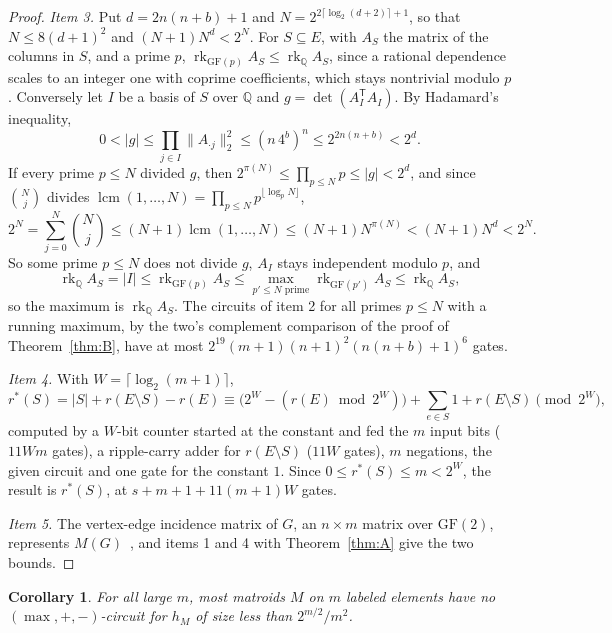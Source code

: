 \documentclass[11pt]{article}
\newtheorem{corollary}[theorem]{Corollary}
\begin{document}
\begin{proof}
\emph{Item 3.}  Put $d=2n(n+b)+1$ and $N=2^{2\lceil\log_2(d+2)\rceil+1}$, so that
$N\le8(d+1)^{2}$ and $(N+1)N^{d}<2^{N}$.  For $S\subseteq E$, with $A_S$ the
matrix of the columns in $S$, and a prime $p$,
$\operatorname{rk}_{\mathrm{GF}(p)}A_S\le\operatorname{rk}_{\mathbb Q}A_S$, since a
rational dependence scales to an integer one with coprime coefficients, which
stays nontrivial modulo $p$.  Conversely let $I$ be a basis of $S$ over
$\mathbb Q$ and $g=\det(A_I^{\mathsf T}A_I)$.  By Hadamard's inequality,
\[
  0<|g|\le\prod_{j\in I}\|A_{\cdot j}\|_2^{2}\le(n\,4^{b})^{n}\le2^{2n(n+b)}<2^{d}.
\]
If every prime $p\le N$ divided $g$, then $2^{\pi(N)}\le\prod_{p\le N}p\le|g|<2^{d}$,
and since $\binom Nj$ divides
$\operatorname{lcm}(1,\ldots,N)=\prod_{p\le N}p^{\lfloor\log_pN\rfloor}$,
\[
  2^{N}=\sum_{j=0}^{N}\binom Nj\le(N+1)\operatorname{lcm}(1,\ldots,N)
  \le(N+1)N^{\pi(N)}<(N+1)N^{d}<2^{N}.
\]
So some prime $p\le N$ does not divide $g$, $A_I$ stays independent modulo $p$, and
\[
  \operatorname{rk}_{\mathbb Q}A_S=|I|\le\operatorname{rk}_{\mathrm{GF}(p)}A_S
  \le\max_{p'\le N\text{ prime}}\operatorname{rk}_{\mathrm{GF}(p')}A_S\le\operatorname{rk}_{\mathbb Q}A_S,
\]
so the maximum is $\operatorname{rk}_{\mathbb Q}A_S$.
The circuits of item 2 for all primes $p\le N$ with a running maximum, by the
two's complement comparison of the proof of Theorem~\ref{thm:B}, have at most
$2^{19}(m+1)(n+1)^{2}(n(n+b)+1)^{6}$ gates.

\emph{Item 4.}  With $W=\lceil\log_2(m+1)\rceil$,
\[
  r^{*}(S)=|S|+r(E\setminus S)-r(E)
  \equiv\bigl(2^{W}-(r(E)\bmod2^{W})\bigr)+\sum_{e\in S}1+r(E\setminus S)\pmod{2^{W}},
\]
computed by a $W$-bit counter started at the constant and fed the $m$ input bits
($11Wm$ gates), a ripple-carry adder for $r(E\setminus S)$ ($11W$ gates), $m$
negations, the given circuit and one gate for the constant $1$.  Since
$0\le r^{*}(S)\le m<2^{W}$, the result is $r^{*}(S)$, at
$s+m+1+11(m+1)W$ gates.

\emph{Item 5.}  The vertex-edge incidence matrix of $G$, an $n\times m$ matrix over
$\mathrm{GF}(2)$, represents $M(G)$~\cite{oxley11}, and items 1 and 4 with
Theorem~\ref{thm:A} give the two bounds.
\end{proof}

\begin{corollary}
\label{cor:count}
For all large $m$, most matroids $M$ on $m$ labeled elements have no $(\max,+,-)$-circuit for $h_M$ of size less than $2^{m/2}/m^{2}$.
\end{corollary}
\end{document}
